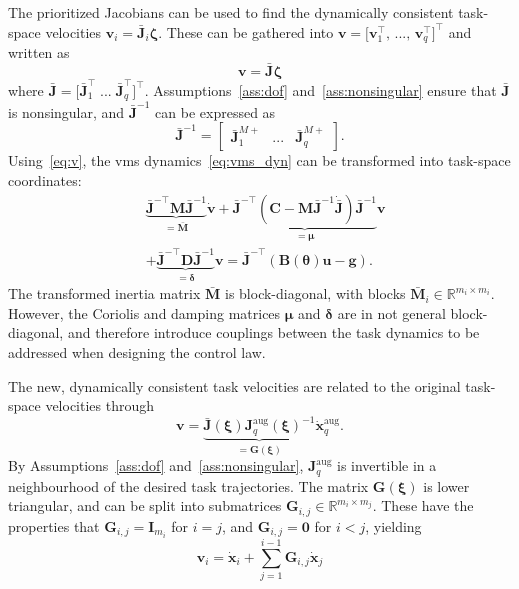 \documentclass[../main.tex]{subfiles}
\begin{document}
%
The prioritized Jacobians can be used to find the dynamically consistent task-space velocities $\bm{v}_i = \bar{\bm{J}}_i\bm{\zeta}$. These can be gathered into $\bm{v} = \bigl[ \bm{v}_1^\top,\, ...,\, \bm{v}_q^\top \bigr]^\top$ and written as
\begin{equation}\label{eq:v}
    \bm{v} = \bar{\bm{J}} \bm{\zeta}
\end{equation}
where $\bar{\bm{J}} = \bigl[ \bar{\bm{J}}_1^\top \; ... \; \bar{\bm{J}}_q^\top \bigr]^\top$. Assumptions~\ref{ass:dof} and~\ref{ass:nonsingular} ensure that $\bar{\bm{J}}$ is nonsingular, and $\bar{\bm{J}}^{-1}$ can be expressed as~\citep{Wu2022}
\begin{equation}
    \bar{\bm{J}}^{-1} = \begin{bmatrix}
        \bar{\bm{J}}^{M+}_1 & ... & \bar{\bm{J}}^{M+}_q
    \end{bmatrix} .
\end{equation}
%
Using~\eqref{eq:v}, the \gls{vms} dynamics~\eqref{eq:vms_dyn} can be transformed into task-space coordinates:
\begin{equation}\label{eq:v_dyn}
    \begin{split}
        &\underbrace{\bar{\bm{J}}^{-\top} \bm{M} \bar{\bm{J}}^{-1}}_{= \bar{\bm{M}}} \dot{\bm{v}} + \underbrace{\bar{\bm{J}}^{-\top} \left( \bm{C} -  \bm{M} \bar{\bm{J}}^{-1} \dot{\bar{\bm{J}}} \right) \bar{\bm{J}}^{-1}}_{=\bm{\mu}} \bm{v}\\
        &+ \underbrace{\bar{\bm{J}}^{-\top} \bm{D} \bar{\bm{J}}^{-1}}_{= \bm{\delta}} \bm{v}  = \bar{\bm{J}}^{-\top} \left( \bm{B} (\bm{\theta} ) \bm{u} - \bm{g} \right) .
    \end{split} 
\end{equation}
The transformed inertia matrix $\bar{\bm{M}}$ is block-diagonal, with blocks $\bar{\bm{M}}_i \in \mathbb{R}^{m_i \times m_i}$. However, the Coriolis and damping matrices $\bm{\mu}$ and $\bm{\delta}$ are in not general block-diagonal, and therefore introduce couplings between the task dynamics to be addressed when designing the control law.

The new, dynamically consistent task velocities are related to the original task-space velocities through
\begin{equation}
    \bm{v} = \underbrace{\bar{\bm{J}}(\bm{\xi}) \bm{J}^{\textrm{aug}}_q(\bm{\xi})^{-1}}_{= \bm{G}(\bm{\xi})} \dot{\bm{x}}^{\textrm{aug}}_q .
\end{equation}
By Assumptions~\ref{ass:dof} and~\ref{ass:nonsingular}, $\bm{J}^{\textrm{aug}}_q$ is invertible in a neighbourhood of the desired task trajectories. The matrix $\bm{G}(\bm{\xi})$ is lower triangular, and can be split into submatrices $\bm{G}_{i,j} \in \mathbb{R}^{m_i \times m_j}$. These have the properties that $\bm{G}_{i,j} = \bm{I}_{m_i}$ for $i = j$, and $\bm{G}_{i,j} = \bm{0}$ for $i < j$, yielding
\begin{equation}\label{eq:vGxdot}
    \bm{v}_i = \dot{\bm{x}}_i + \sum_{j=1}^{i-1} \bm{G}_{i,j} \dot{\bm{x}}_j
\end{equation}
\end{document}

